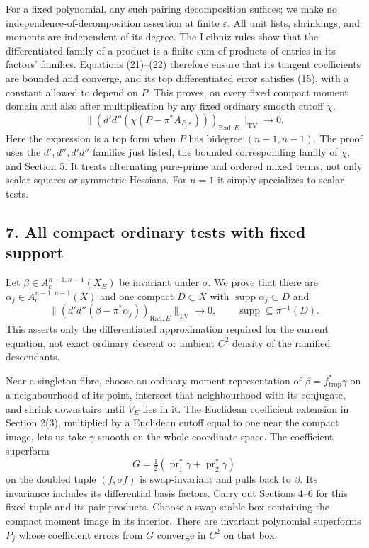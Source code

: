 \documentclass[
  11pt,
]{article}
\begin{document}
For a fixed polynomial, any such pairing decomposition suffices; we make
no independence-of-decomposition assertion at finite \(\varepsilon\).
All unit lists, shrinkings, and moments are independent of its degree.
The Leibniz rules show that the differentiated family of a product is a
finite sum of products of entries in its factors' families. Equations
(21)--(22) therefore ensure that its tangent coefficients are bounded
and converge, and its top differentiated error satisfies (15), with a
constant allowed to depend on \(P\). This proves, on every fixed compact
moment domain and also after multiplication by any fixed ordinary smooth
cutoff \(\chi\), \[
 \big\|(d'd''(\chi(P-\pi^*A_{P,\varepsilon})))_{\mathrm{Rad},E}
       \big\|_{\mathrm{TV}}\longrightarrow0.                \tag{23}
\] Here the expression is a top form when \(P\) has bidegree
\((n-1,n-1)\). The proof uses the \(d',d'',d'd''\) families just listed,
the bounded corresponding family of \(\chi\), and Section 5. It treats
alternating pure-prime and ordered mixed terms, not only scalar squares
or symmetric Hessians. For \(n=1\) it simply specializes to scalar
tests.

\subsection{7. All compact ordinary tests with fixed
support}\label{all-compact-ordinary-tests-with-fixed-support}

Let \(\beta\in A_c^{n-1,n-1}(X_E)\) be invariant under \(\sigma\). We
prove that there are \(\alpha_j\in A_c^{n-1,n-1}(X)\) and one compact
\(D\subset X\) with \(\operatorname{supp}\alpha_j\subset D\) and \[
 \big\|(d'd''(\beta-\pi^*\alpha_j))_{\mathrm{Rad},E}
       \big\|_{\mathrm{TV}}\to0,
 \qquad \operatorname{supp}\subseteq\pi^{-1}(D).            \tag{24}
\] This asserts only the differentiated approximation required for the
current equation, not exact ordinary descent or ambient \(C^2\) density
of the ramified descendants.

Near a singleton fibre, choose an ordinary moment representation of
\(\beta=f_{\mathrm{trop}}^*\gamma\) on a neighbourhood of its point,
intersect that neighbourhood with its conjugate, and shrink downstairs
until \(V_E\) lies in it. The Euclidean coefficient extension in Section
2(3), multiplied by a Euclidean cutoff equal to one near the compact
image, lets us take \(\gamma\) smooth on the whole coordinate space. The
coefficient superform \[
 G=\tfrac12(\operatorname{pr}_1^*\gamma+
                           \operatorname{pr}_2^*\gamma)               \tag{25}
\] on the doubled tuple \((f,\sigma f)\) is swap-invariant and pulls
back to \(\beta\). Its invariance includes its differential basis
factors. Carry out Sections 4--6 for this fixed tuple and its pair
products. Choose a swap-stable box containing the compact moment image
in its interior. There are invariant polynomial superforms \(P_j\) whose
coefficient errors from \(G\) converge in \(C^2\) on that box.
\end{document}
